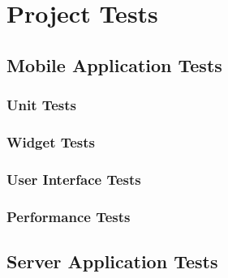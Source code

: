 \chapter{Project Tests}
\section{Mobile Application Tests}
\subsection{Unit Tests}
\subsection{Widget Tests}
\subsection{User Interface Tests}
\subsection{Performance Tests}
\section{Server Application Tests}
